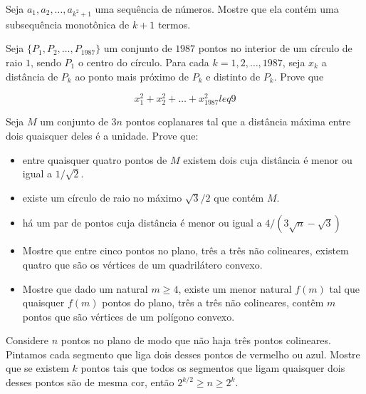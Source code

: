 \begin{questao}
  Seja $a_1,a_2,\ldots,a_{k^2+1}$ uma sequência de
  números. Mostre que ela contém uma subsequência monotônica de
  $k+1$ termos.
\end{questao}

\begin{questao}
  Seja $\{P_1,P_2,\ldots,P_{1987}\}$ um conjunto de
  $1987$ pontos no interior de um círculo de raio $1$, sendo
  $P_1$ o centro do círculo. Para cada $k=1,2,\ldots,1987$, seja
  $x_k$ a distância de $P_k$ ao ponto mais próximo de $P_k$ e
  distinto de $P_k$. Prove que

  $$x_1^2+x_2^2+\ldots+x_{1987}^2 leq 9$$
\end{questao}

\begin{questao}
  Seja $M$ um conjunto de $3n$ pontos coplanares tal que
  a distância máxima entre dois quaisquer deles é a unidade. Prove
  que:
  \begin{itemize}
    \item entre quaisquer quatro pontos de $M$ existem dois cuja
    distância é menor ou igual a $1/\sqrt{2}$.

    \item existe um círculo de raio no máximo $\sqrt{3}/2$ que contém
    $M$.

    \item há um par de pontos cuja distância é menor ou igual a $4/(3\sqrt{n}-\sqrt{3})$
  \end{itemize}
\end{questao}

\begin{questao}
  \begin{itemize}
    \item Mostre que entre cinco pontos no plano, três a três não
    colineares, existem quatro que são os vértices de um quadrilátero
    convexo.

    \item Mostre que dado um natural $m \geq 4$, existe um menor
    natural $f(m)$ tal que quaisquer $f(m)$ pontos do plano, três
    a três não colineares, contêm $m$ pontos que são vértices de um
    polígono convexo.
  \end{itemize}
\end{questao}

\begin{questao}
  Considere $n$ pontos no plano de modo que não haja três
  pontos colineares. Pintamos cada segmento que liga dois desses
  pontos de vermelho ou azul. Mostre que se existem $k$ pontos tais
  que todos os segmentos que ligam quaisquer dois desses pontos são de
  mesma cor, então $2^{k/2} \geq n \geq 2^k$.
\end{questao}

